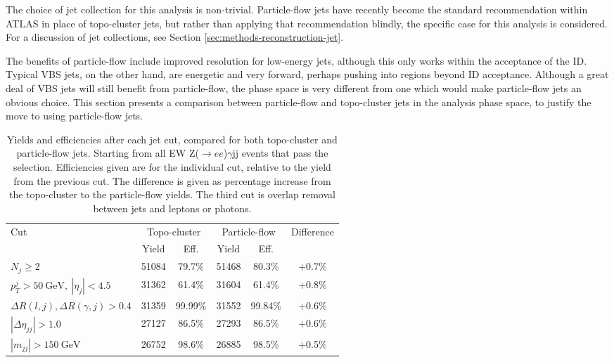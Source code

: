 
The choice of jet collection for this analysis is non-trivial. Particle-flow
jets have recently become the standard recommendation within \ac{ATLAS} in place
of topo-cluster jets, but rather than applying that recommendation blindly,
the specific case for this analysis is considered. For a discussion of jet
collections, see Section \ref{sec:methods-reconstruction-jet}.

The benefits of particle-flow include improved resolution for low-energy jets,
although this only works within the acceptance of the \ac{ID}.  Typical \ac{VBS}
jets, on the other hand, are energetic and very forward, perhaps pushing into
regions beyond \ac{ID} acceptance. Although a great deal of \ac{VBS} jets will
still benefit from particle-flow, the phase space is very different from one
which would make particle-flow jets an obvious choice. This section presents a
comparison between particle-flow and topo-cluster jets in the analysis phase
space, to justify the move to using particle-flow jets.

\begin{table}[!b]
  \centering
  \caption{
    Yields and efficiencies after each jet cut, compared for both topo-cluster
    and particle-flow jets. Starting from all EW Z($\to ee$)$\gamma$jj
    events that pass the \Zy selection. Efficiencies given are for the
    individual cut, relative to the yield from the previous cut. The difference
    is given as percentage increase from the topo-cluster to the particle-flow
    yields. The third cut is overlap removal between jets and leptons or
    photons.
  }
  \renewcommand\arraystretch{1.3}
  \begin{tabular}{p{5cm}ccccc}
    \midrule\midrule 
    \multirow{2}{2em}{Cut} & \multicolumn{2}{c}{Topo-cluster} &
    \multicolumn{2}{c}{Particle-flow} & \multirow{2}{5em}{Difference}\\
    \cmidrule(lr){2-3}\cmidrule(lr){4-5}
    & \multicolumn{1}{c}{Yield} & Eff. & \multicolumn{1}{c}{Yield} & Eff. & \\
    \midrule
    $N_j \geq 2$
    & 51084 & 79.7\% & 51468 & 80.3\% & +0.7\% \\
    $p_T^j > 50~\mathrm{GeV},~|\eta_j| < 4.5$
    & 31362 & 61.4\% & 31604 & 61.4\% & +0.8\% \\
    $\Delta R(l,j), \Delta R(\gamma,j) > 0.4$
    & 31359 & 99.99\% & 31552 & 99.84\% & +0.6\% \\
    $|\Delta\eta_{jj}| > 1.0$
    & 27127 & 86.5\% & 27293 & 86.5\% & +0.6\% \\
    $|m_{jj}| > 150~\mathrm{GeV}$
    & 26752 & 98.6\% & 26885 & 98.5\% & +0.5\% \\
    \midrule\midrule
  \end{tabular}
  \label{tbl:vbs-pflow-cutflow}
\end{table}

